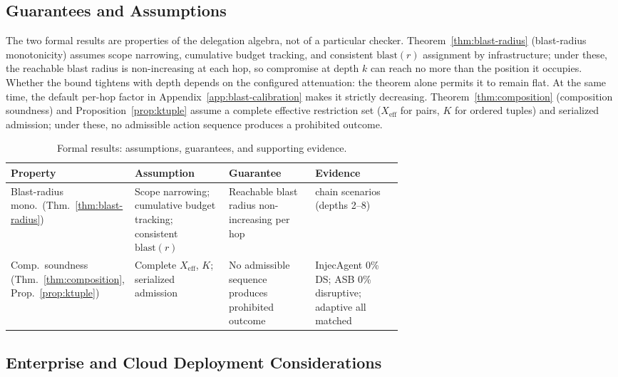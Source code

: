 \documentclass[sigconf,nonacm]{acmart}
\begin{document}
\subsection{Guarantees and Assumptions}\label{sec:guarantees}

The two formal results are properties of the delegation algebra, not of a particular checker. Theorem~\ref{thm:blast-radius} (blast-radius monotonicity) assumes scope narrowing, cumulative budget tracking, and consistent $\mathrm{blast}(r)$ assignment by infrastructure; under these, the reachable blast radius is non-increasing at each hop, so compromise at depth $k$ can reach no more than the position it occupies. Whether the bound tightens with depth depends on the configured attenuation: the theorem alone permits it to remain flat. At the same time, the default per-hop factor in Appendix~\ref{app:blast-calibration} makes it strictly decreasing. Theorem~\ref{thm:composition} (composition soundness) and Proposition~\ref{prop:ktuple} assume a complete effective restriction set ($X_{\mathrm{eff}}$ for pairs, $K$ for ordered tuples) and serialized admission; under these, no admissible action sequence produces a prohibited outcome.

\begin{table}[t]
\centering
\footnotesize
\caption{Formal results: assumptions, guarantees, and supporting evidence.}
\label{tab:formal-results}
\begin{tabularx}{\linewidth}{@{}>{\raggedright\arraybackslash}p{0.18\linewidth}>{\raggedright\arraybackslash}p{0.24\linewidth}>{\raggedright\arraybackslash}p{0.22\linewidth}>{\raggedright\arraybackslash}X@{}}
\toprule
\textbf{Property} & \textbf{Assumption} & \textbf{Guarantee} & \textbf{Evidence} \\
\midrule
Blast-radius mono.\ (Thm.~\ref{thm:blast-radius}) & Scope narrowing; cumulative budget tracking; consistent $\mathrm{blast}(r)$ & Reachable blast radius non-increasing per hop & 99 chain scenarios (depths 2--8) \\
\addlinespace
Comp.\ soundness (Thm.~\ref{thm:composition}, Prop.~\ref{prop:ktuple}) & Complete $X_{\mathrm{eff}}$, $K$; serialized admission & No admissible sequence produces prohibited outcome & InjecAgent 0\% DS; ASB 0\% disruptive; adaptive all matched \\
\bottomrule
\end{tabularx}
\end{table}

\subsection{Enterprise and Cloud Deployment Considerations}\label{sec:deployment}
\end{document}
